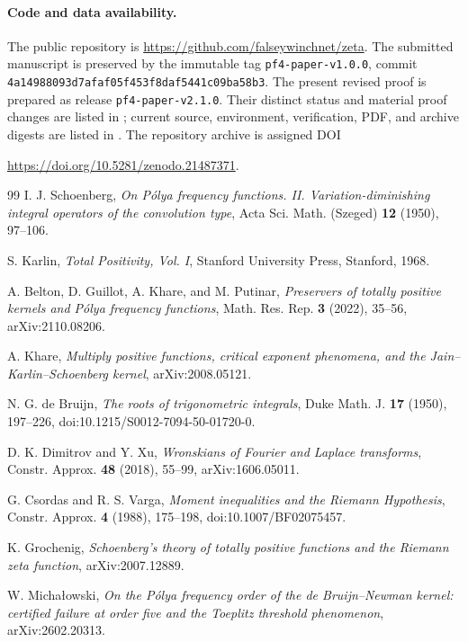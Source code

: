 \documentclass[11pt]{article}
\theoremstyle{remark}
\numberwithin{equation}{section}
\begin{document}
\paragraph{Code and data availability.}
The public repository is
\url{https://github.com/falseywinchnet/zeta}. The submitted manuscript is
preserved by the immutable tag \texttt{pf4-paper-v1.0.0}, commit
{\footnotesize\texttt{4a14988093d7afaf05f453f8daf5441c09ba58b3}}. The present revised proof is
prepared as release \texttt{pf4-paper-v2.1.0}.
Their distinct status and material proof changes are listed in
; current source, environment, verification,
PDF, and archive digests are listed in . The
repository archive is assigned DOI
\begin{center}
\url{https://doi.org/10.5281/zenodo.21487371}.
\end{center}
\clearpage
\begin{thebibliography}{99}
I. J. Schoenberg,
\emph{On P\'olya frequency functions. II. Variation-diminishing integral
operators of the convolution type},
Acta Sci. Math. (Szeged) \textbf{12} (1950), 97--106.

S. Karlin,
\emph{Total Positivity, Vol. I},
Stanford University Press, Stanford, 1968.

A. Belton, D. Guillot, A. Khare, and M. Putinar,
\emph{Preservers of totally positive kernels and P\'olya frequency functions},
Math. Res. Rep. \textbf{3} (2022), 35--56,
arXiv:2110.08206.

A. Khare,
\emph{Multiply positive functions, critical exponent phenomena, and the
Jain--Karlin--Schoenberg kernel},
arXiv:2008.05121.

N. G. de Bruijn,
\emph{The roots of trigonometric integrals},
Duke Math. J. \textbf{17} (1950), 197--226,
doi:10.1215/S0012-7094-50-01720-0.

D. K. Dimitrov and Y. Xu,
\emph{Wronskians of Fourier and Laplace transforms},
Constr. Approx. \textbf{48} (2018), 55--99,
arXiv:1606.05011.

G. Csordas and R. S. Varga,
\emph{Moment inequalities and the Riemann Hypothesis},
Constr. Approx. \textbf{4} (1988), 175--198,
doi:10.1007/BF02075457.

K. Grochenig,
\emph{Schoenberg's theory of totally positive functions and the Riemann zeta
function},
arXiv:2007.12889.

W. Micha\l{}owski,
\emph{On the P\'olya frequency order of the de Bruijn--Newman kernel:
certified failure at order five and the Toeplitz threshold phenomenon},
arXiv:2602.20313.
\end{thebibliography}
\end{document}
